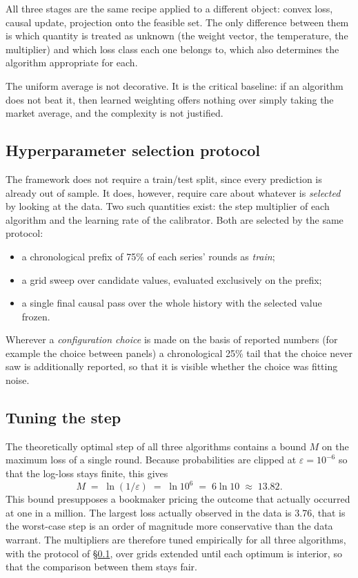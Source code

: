 \documentclass[12pt,a4paper,oneside]{report}
\renewcommand{\_}{\oldunderscore\allowbreak}
\theoremstyle{definition}
\theoremstyle{plain}
\theoremstyle{definition}   %
\begin{document}
All three stages are the same recipe applied to a different object: convex loss, causal update,
projection onto the feasible set. The only difference between them is which quantity is treated
as unknown (the weight vector, the temperature, the multiplier) and which loss class each one
belongs to, which also determines the algorithm appropriate for each.

The uniform average is not decorative. It is the critical baseline: if an algorithm does not beat
it, then learned weighting offers nothing over simply taking the market average, and the
complexity is not justified.

\subsection{Hyperparameter selection protocol}
\label{sec:protocol}

The framework does not require a train/test split, since every prediction is already
out of sample. It does, however, require care about whatever is \emph{selected} by looking at the
data. Two such quantities exist: the step multiplier of each algorithm and the learning rate of
the calibrator. Both are selected by the same protocol:

\begin{itemize}
  \item a chronological prefix of 75\% of each series' rounds as \emph{train};
  \item a grid sweep over candidate values, evaluated exclusively on the prefix;
  \item a single final causal pass over the whole history with the selected value frozen.
\end{itemize}

Wherever a \emph{configuration choice} is made on the basis of reported numbers (for example
the choice between panels) a chronological 25\% tail that the choice never saw is additionally
reported, so that it is visible whether the choice was fitting noise.

\subsection{Tuning the step}
\label{sec:tuning-step}

The theoretically optimal step of all three algorithms contains a bound $M$ on the maximum loss
of a single round. Because probabilities are clipped at $\varepsilon = 10^{-6}$ so that the
log-loss stays finite, this gives
\[
M \;=\; \ln(1/\varepsilon) \;=\; \ln 10^{6} \;=\; 6\ln 10 \;\approx\; 13.82 .
\]
This bound presupposes a bookmaker pricing the outcome that actually occurred at one in a
million. The largest loss actually observed in the data is 3.76, that is the worst-case step is
an order of magnitude more conservative than the data warrant. The multipliers are therefore
tuned empirically for all three algorithms, with the protocol of \S\ref{sec:protocol}, over
grids extended until each optimum is interior, so that the comparison between them stays fair.
\end{document}
